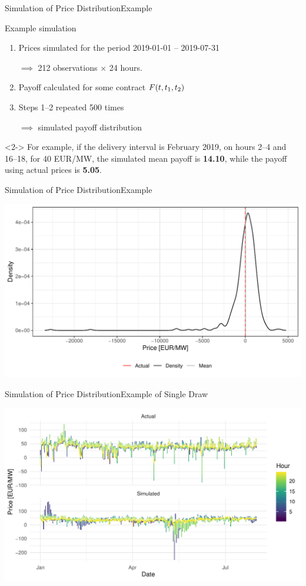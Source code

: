 \begin{frame}{Simulation of Price Distribution}{Example}
  \begin{block}{Example simulation}
    \begin{enumerate}
    \item Prices simulated for the period 2019-01-01 -- 2019-07-31

      \(\implies\) 212 observations \(\times\) 24 hours.
    \item Payoff calculated for some contract \(F\of{t, t_{1}, t_{2}}\)
    \item Steps 1--2 repeated 500 times

      \(\implies\) simulated payoff distribution
    \end{enumerate}
   \end{block}
   \begin{block}{}<2->
     For example, if the delivery interval is February 2019, on hours 2--4 and 16--18, for 40 EUR/MW, the simulated mean payoff is \textbf{14.10}, while the payoff using actual prices is \textbf{5.05}.
   \end{block}
\end{frame}

\begin{frame}{Simulation of Price Distribution}{Example}
  \begin{center}
    \includegraphics[width=\textwidth]{img/payoff-density}
  \end{center}
\end{frame}

\begin{frame}{Simulation of Price Distribution}{Example of Single Draw}
  \begin{center}
    \includegraphics[width=\textwidth]{img/sim-vs-actual}
  \end{center}
\end{frame}

